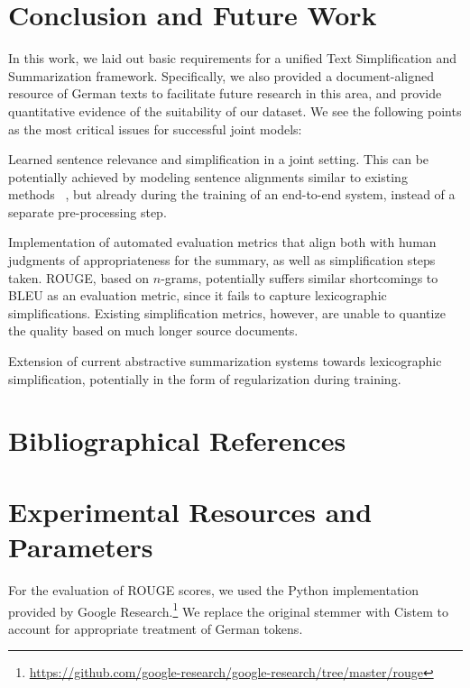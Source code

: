\documentclass[10pt, a4paper]{article}
\begin{document}
\section{Conclusion and Future Work}
In this work, we laid out basic requirements for a unified Text Simplification and Summarization framework.
Specifically, we also provided a document-aligned resource of German texts to facilitate future research in this area, and provide quantitative evidence of the suitability of our dataset.
We see the following points as the most critical issues for successful joint models:
\begin{inparaenum}[i)]
	\item Learned sentence relevance and simplification in a joint setting. This can be potentially achieved by modeling sentence alignments similar to existing methods~ \cite{stajner-etal-2018-cats,jiang-etal-2020-neural}, but already during the training of an end-to-end system, instead of a separate pre-processing step.
	\item Implementation of automated evaluation metrics that align both with human judgments of appropriateness for the summary, as well as simplification steps taken. ROUGE, based on $n$-grams, potentially suffers similar shortcomings to BLEU as an evaluation metric, since it fails to capture lexicographic simplifications. Existing simplification metrics, however, are unable to quantize the quality based on much longer source documents.
	\item Extension of current abstractive summarization systems towards lexicographic simplification, potentially in the form of regularization during training.
\end{inparaenum}








\section{Bibliographical References}\label{reference}








\appendix
\section{Experimental Resources and Parameters}
For the evaluation of ROUGE scores, we used the Python implementation provided by Google Research.\footnote{\url{https://github.com/google-research/google-research/tree/master/rouge}}
We replace the original stemmer with Cistem \cite{weissweiler2017developing} to account for appropriate treatment of German tokens.
\end{document}
